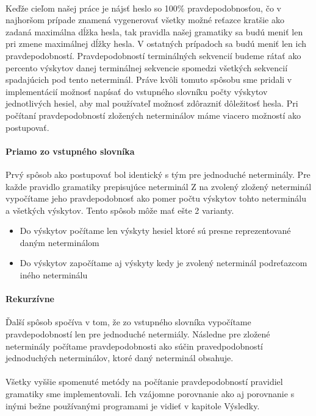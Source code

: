 \paragraph{}
Keďže cieľom našej práce je nájsť heslo so 100\% pravdepodobnosťou, čo v najhoršom prípade znamená vygenerovať všetky možné reťazce kratšie ako zadaná maximálna dĺžka hesla, tak pravidla našej gramatiky sa budú meniť len pri zmene maximálnej dĺžky hesla. V ostatných prípadoch sa budú meniť len ich pravdepodobností. Pravdepodobností terminálných sekvencií budeme rátať ako percento výskytov danej terminálnej sekvencie spomedzi všetkých sekvencií spadajúcich pod tento neterminál. Práve kvôli tomuto spôsobu sme pridali v implementácií možnosť napísať do vstupného slovníku počty výskytov jednotlivých hesiel, aby mal používateľ možnosť zdôrazniť dôležitosť hesla. Pri počítaní pravdepodobností zložených neterminálov máme viacero možností ako postupovať.
\paragraph{Priamo zo vstupného slovníka}
Prvý spôsob ako postupovať bol identický s tým pre jednoduché neterminály. Pre každe pravidlo gramatiky prepisujúce neterminál Z na zvolený zložený neterminál vypočítame jeho pravdepodobnosť ako pomer počtu výskytov tohto neterminálu a všetkých výskytov. Tento spôsob môže mať ešte 2 varianty.
\begin{itemize}
	\item Do výskytov počítame len výskyty hesiel ktoré sú presne reprezentované daným neterminálom
	\item Do výskytov započítame aj výskyty kedy je zvolený neterminál podreťazcom iného neterminálu
\end{itemize}

\paragraph{Rekurzívne}
Ďalší spôsob spočíva v tom, že zo vstupného slovníka vypočítame pravdepodobností len pre jednoduché netermiály. Následne pre zložené neterminály počítame pravdepodobnosti ako súčin pravedpodobností jednoduchých neterminálov, ktoré daný neterminál obsahuje.

\paragraph{}
Všetky vyššie spomenuté metódy na počítanie pravdepodobností pravidiel gramatiky sme implementovali. Ich vzájomne porovnanie ako aj porovnanie s inými bežne používanými programami je vidieť v kapitole Výsledky.